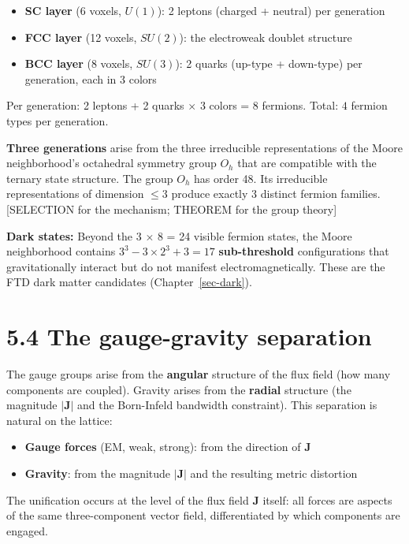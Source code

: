 \documentclass[
  11pt,
  letterpaper,
  twoside,
  openright]{book}
\providecommand{\tightlist}{%
  \setlength{\itemsep}{0pt}\setlength{\parskip}{0pt}}
\begin{document}
\begin{itemize}
\tightlist
\item
  \textbf{SC layer} (6 voxels, \(U(1)\)): 2 leptons (charged + neutral)
  per generation
\item
  \textbf{FCC layer} (12 voxels, \(SU(2)\)): the electroweak doublet
  structure
\item
  \textbf{BCC layer} (8 voxels, \(SU(3)\)): 2 quarks (up-type +
  down-type) per generation, each in 3 colors
\end{itemize}

Per generation: 2 leptons + 2 quarks \(\times\) 3 colors = 8 fermions.
Total: \(4\) fermion types per generation.

\textbf{Three generations} arise from the three irreducible
representations of the Moore neighborhood's octahedral symmetry group
\(O_h\) that are compatible with the ternary state structure. The group
\(O_h\) has order 48. Its irreducible representations of dimension
\(\leq 3\) produce exactly 3 distinct fermion families. {[}SELECTION for
the mechanism; THEOREM for the group theory{]}

\textbf{Dark states:} Beyond the 3 \(\times\) 8 = 24 visible fermion
states, the Moore neighborhood contains \(3^3 - 3 \times 2^3 + 3 = 17\)
\textbf{sub-threshold} configurations that gravitationally interact but
do not manifest electromagnetically. These are the FTD dark matter
candidates (Chapter~\ref{sec-dark}).

\section{5.4 The gauge-gravity
separation}\label{the-gauge-gravity-separation}

The gauge groups arise from the \textbf{angular} structure of the flux
field (how many components are coupled). Gravity arises from the
\textbf{radial} structure (the magnitude \(|\mathbf{J}|\) and the
Born-Infeld bandwidth constraint). This separation is natural on the
lattice:

\begin{itemize}
\tightlist
\item
  \textbf{Gauge forces} (EM, weak, strong): from the direction of
  \(\mathbf{J}\)
\item
  \textbf{Gravity}: from the magnitude \(|\mathbf{J}|\) and the
  resulting metric distortion
\end{itemize}

The unification occurs at the level of the flux field \(\mathbf{J}\)
itself: all forces are aspects of the same three-component vector field,
differentiated by which components are engaged.
\end{document}
